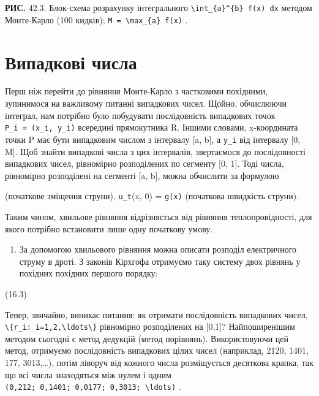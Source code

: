 \documentclass[
  ukrainian,
]{article}
\author{}
\date{}
\providecommand{\tightlist}{%
  \setlength{\itemsep}{0pt}\setlength{\parskip}{0pt}}
\begin{document}
\textbf{РИС.} 42.3. Блок-схема розрахунку інтегрального
\texttt{\textbackslash{}int\_\{a\}\^{}\{b\}\ f(x)\ dx} методом
Монте-Карло (100 кидків);
\texttt{M\ =\ \textbackslash{}max\_\{a\}\ f(x)} .

\section{Випадкові
числа}\label{ux432ux438ux43fux430ux434ux43aux43eux432ux456-ux447ux438ux441ux43bux430}

Перш ніж перейти до рівняння Монте-Карло з частковими похідними,
зупинимося на важливому питанні випадкових чисел. Щойно, обчислюючи
інтеграл, нам потрібно було побудувати послідовність випадкових точок
\texttt{P\_i\ =\ (x\_i,\ y\_i)} всередині прямокутника R. Іншими
словами, x-координата точки P має бути випадковим числом з інтервалу
{[}a, b{]}, а \texttt{y\_i} від інтервалу {[}0, M{]}. Щоб знайти
випадкові числа з цих інтервалів, звертаємося до послідовності
випадкових чисел, рівномірно розподілених по сегменту {[}0, 1{]}. Тоді
числа, рівномірно розподілені на сегменті {[}a, b{]}, можна обчислити за
формулою

(початкове зміщення струни), \texttt{u\_t}(x, 0) = \texttt{g(x)}
(початкова швидкість струни).

Таким чином, хвильове рівняння відрізняється від рівняння
теплопровідності, для якого потрібно встановити лише одну початкову
умову.

\begin{enumerate}
\def\labelenumi{\arabic{enumi}.}
\setcounter{enumi}{3}
\tightlist
\item
  За допомогою хвильового рівняння можна описати розподіл електричного
  струму в дроті. З законів Кірхгофа отримуємо таку систему двох рівнянь
  у похідних похідних першого порядку:
\end{enumerate}

(16.3)

Тепер, звичайно, виникає питання: як отримати послідовність випадкових
чисел,
\texttt{\textbackslash{}\{r\_i:\ i=1,2,\textbackslash{}ldots\textbackslash{}\}}
рівномірно розподілених на {[}0,1{]}? Найпоширенішим методом сьогодні є
метод дедукцій (метод порівнянь). Використовуючи цей метод, отримуємо
послідовність випадкових цілих чисел (наприклад, 2120, 1401, 177,
3013,\ldots), потім ліворуч від кожного числа розміщується десяткова
крапка, так що всі числа знаходяться між нулем і одним
\texttt{(0,212;\ 0,1401;\ 0,0177;\ 0,3013;\ \textbackslash{}ldots)} .
\end{document}
